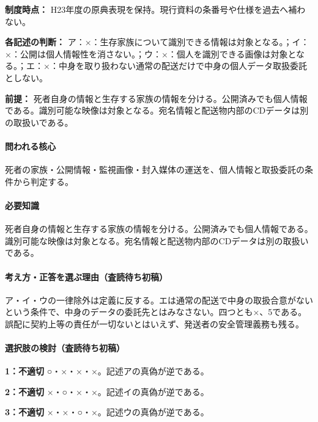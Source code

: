 \noindent\textbf{制度時点：} H23年度の原典表現を保持。現行資料の条番号や仕様を過去へ補わない。\par

\noindent\textbf{各記述の判断：} ア：×：生存家族について識別できる情報は対象となる。；イ：×：公開は個人情報性を消さない。；ウ：×：個人を識別できる画像は対象となる。；エ：×：中身を取り扱わない通常の配送だけで中身の個人データ取扱委託としない。\par

\noindent\textbf{前提：} 死者自身の情報と生存する家族の情報を分ける。公開済みでも個人情報である。識別可能な映像は対象となる。宛名情報と配送物内部のCDデータは別の取扱いである。\par

\paragraph{問われる核心} 死者の家族・公開情報・監視画像・封入媒体の運送を、個人情報と取扱委託の条件から判定する。

\paragraph{必要知識} 死者自身の情報と生存する家族の情報を分ける。公開済みでも個人情報である。識別可能な映像は対象となる。宛名情報と配送物内部のCDデータは別の取扱いである。

\paragraph{考え方・正答を選ぶ理由（査読待ち初稿）} ア・イ・ウの一律除外は定義に反する。エは通常の配送で中身の取扱合意がないという条件で、中身のデータの委託先とはみなさない。四つとも×、5である。誤配に契約上等の責任が一切ないとはいえず、発送者の安全管理義務も残る。

\paragraph{選択肢の検討（査読待ち初稿）}\mbox{}\par

\noindent\textbf{1：不適切} ○・×・×・×。記述アの真偽が逆である。\par

\noindent\textbf{2：不適切} ×・○・×・×。記述イの真偽が逆である。\par

\noindent\textbf{3：不適切} ×・×・○・×。記述ウの真偽が逆である。\par

